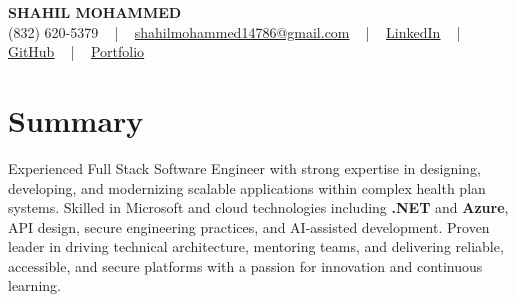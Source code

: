 \documentclass[letterpaper,10pt]{article}
\begin{document}
\begin{center}
    {\fontsize{14pt}{12pt}\selectfont \textbf{\MakeUppercase{Shahil Mohammed}}}\\ \vspace{2pt}
    \fontsize{10pt}{12pt}\selectfont (832) 620-5379 ~ | ~ \href{mailto:shahilmohammed14786@gmail.com}{shahilmohammed14786@gmail.com} ~ | ~  
    \href{https://www.linkedin.com/in/shahil-mohammed-9652931a1/}{\color{blue}\underline{LinkedIn}}  ~ | ~ 
    \href{https://github.com/freakbeast14}{\color{blue}\underline{GitHub}} ~ | ~ 
    \href{https://shahil-mohammed.netlify.app/}{\color{blue}\underline{Portfolio}}
    \vspace{-8pt}
\end{center}

\section{Summary}
\vspace{-2pt}\fontsize{8pt}{9pt}\selectfont
Experienced Full Stack Software Engineer with strong expertise in designing, developing, and modernizing scalable applications within complex health plan systems. Skilled in Microsoft and cloud technologies including \textbf{.NET} and \textbf{Azure}, API design, secure engineering practices, and AI-assisted development. Proven leader in driving technical architecture, mentoring teams, and delivering reliable, accessible, and secure platforms with a passion for innovation and continuous learning.  
 \vspace{-5pt}
 
\vspace{-2pt}
\end{document}
